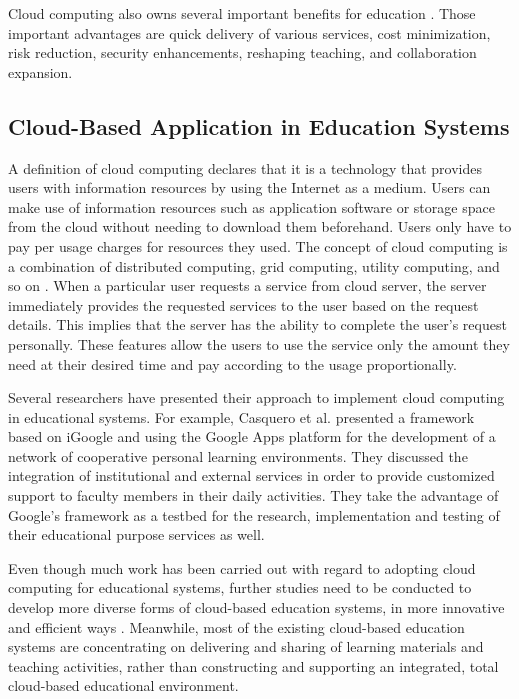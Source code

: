 \documentclass[journal]{vgtc}
\begin{document}
  Cloud computing also owns several important benefits for education \cite{Bouyer2014}. Those important advantages are quick delivery of various services, cost minimization, risk reduction, security enhancements, reshaping teaching, and collaboration expansion.

  \subsection{Cloud-Based Application in Education Systems}
  A definition of cloud computing declares that it is a technology that provides users with information resources by using the Internet as a medium. Users can make use of information resources such as application software or storage space from the cloud without needing to download them beforehand. Users only have to pay per usage charges for resources they used. The concept of cloud computing is a combination of distributed computing, grid computing, utility computing, and so on \cite{s110807835}. When a particular user requests a service from cloud server, the server immediately provides the requested services to the user based on the  request details. This implies that the server has the ability to complete the user's request personally. These features allow the users to use the service only the amount they need at their desired time and pay according to the usage proportionally.
  
  Several researchers have presented their approach to implement cloud computing in educational systems. For example, Casquero et al. \cite{casquero2008igoogle} presented a framework based on iGoogle and using the Google Apps platform for the development of a network of cooperative personal learning environments. They discussed the integration of institutional and external services in order to provide customized support to faculty members in their daily activities. They take the advantage of Google's framework as a testbed for the research, implementation and testing of their educational purpose services as well.

  Even though much work has been carried out with regard to adopting cloud computing for educational systems, further studies need to be conducted to develop more diverse forms of cloud-based education systems, in more innovative and efficient ways \cite{jeong2013content}. Meanwhile, most of the existing cloud-based education systems are concentrating on delivering and sharing of learning materials and teaching activities, rather than constructing and supporting an integrated, total cloud-based educational environment.
\end{document}
